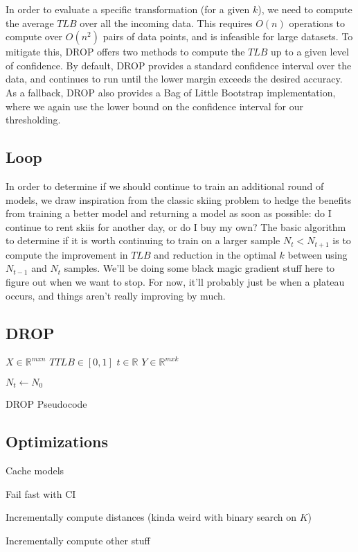  
In order to evaluate a specific transformation (for a given $k$), we need to compute the average $TLB$ over all the incoming data. This requires $O(n)$ operations to compute over $O(n^2)$ pairs of data points, and is infeasible for large datasets. To mitigate this, DROP offers two methods to compute the $TLB$ up to a given level of confidence. By default, DROP provides a standard confidence interval over the data, and continues to run until the lower margin exceeds the desired accuracy. As a fallback, DROP also provides a Bag of Little Bootstrap implementation, where we again use the lower bound on the confidence interval for our thresholding. 

\subsection{Loop}

In order to determine if we should continue to train an additional round of models, we draw inspiration from the classic skiing problem to hedge the benefits from training a better model and returning a model as soon as possible: do I continue to rent skiis for another day, or do I buy my own? The basic algorithm to determine if it is worth continuing to train on a larger sample $N_t < N_{t+1}$ is to compute the improvement in $TLB$ and reduction in the optimal $k$ between using $N_{t-1}$ and $N_t$ samples. We'll be doing some black magic gradient stuff here to figure out when we want to stop. For now, it'll probably just be when a plateau occurs, and things aren't really improving by much.


\subsection{DROP}
\begin{algorithm}
\begin{algorithmic}
\State $X \in \mathbb{R}^{mxn}$
\State $TTLB \in \left[0,1\right]$ 
\State $ t \in \mathbb{R}$
\State $Y \in \mathbb{R}^{mxk}$
	
	\State $N_t \gets N_0$ 
	\EndWhile
\EndFunction
\end{algorithmic}
\caption{DROP Pseudocode}
\label{alg:main}
\end{algorithm}



\subsection{Optimizations}
Cache models

Fail fast with CI

Incrementally compute distances (kinda weird with binary search on $K$)

Incrementally compute other stuff
